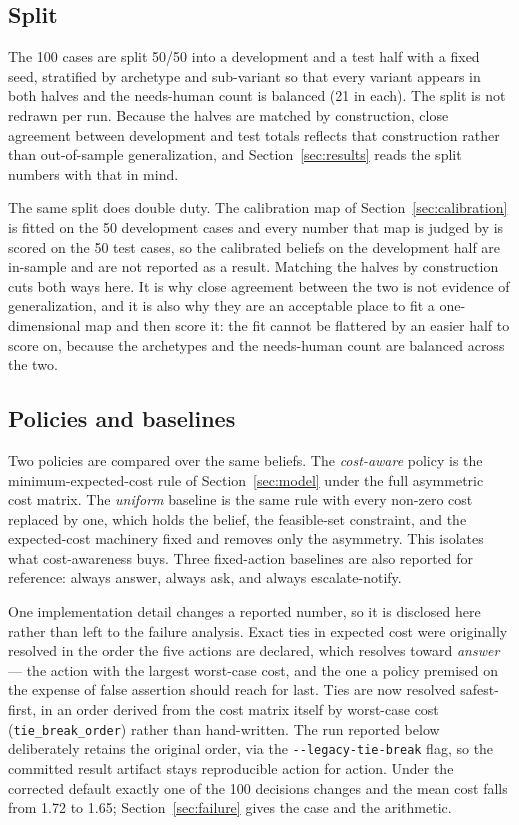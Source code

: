 \documentclass{article}
\begin{document}
\subsection{Split}
The 100 cases are split 50/50 into a development and a test half with a fixed
seed, stratified by archetype and sub-variant so that every variant appears in
both halves and the needs-human count is balanced (21 in each). The split is not
redrawn per run. Because the halves are matched by construction, close agreement
between development and test totals reflects that construction rather than
out-of-sample generalization, and Section~\ref{sec:results} reads the split
numbers with that in mind.

The same split does double duty. The calibration map of
Section~\ref{sec:calibration} is fitted on the 50 development cases and every
number that map is judged by is scored on the 50 test cases, so the calibrated
beliefs on the development half are in-sample and are not reported as a result.
Matching the halves by construction cuts both ways here. It is why close agreement
between the two is not evidence of generalization, and it is also why they are an
acceptable place to fit a one-dimensional map and then score it: the fit cannot be
flattered by an easier half to score on, because the archetypes and the
needs-human count are balanced across the two.

\subsection{Policies and baselines}
Two policies are compared over the same beliefs. The \emph{cost-aware} policy is
the minimum-expected-cost rule of Section~\ref{sec:model} under the full
asymmetric cost matrix. The \emph{uniform} baseline is the same rule with every
non-zero cost replaced by one, which holds the belief, the feasible-set
constraint, and the expected-cost machinery fixed and removes only the asymmetry.
This isolates what cost-awareness buys. Three fixed-action baselines are also
reported for reference: always answer, always ask, and always escalate-notify.

One implementation detail changes a reported number, so it is disclosed here
rather than left to the failure analysis. Exact ties in expected cost were
originally resolved in the order the five actions are declared, which resolves
toward \emph{answer} --- the action with the largest worst-case cost, and the one a
policy premised on the expense of false assertion should reach for last. Ties are
now resolved safest-first, in an order derived from the cost matrix itself by
worst-case cost (\texttt{tie\_break\_order}) rather than hand-written. The run
reported below deliberately retains the original order, via the
\texttt{-}\texttt{-legacy-tie-break} flag, so the committed result artifact stays
reproducible action for action. Under the corrected default exactly one of the 100
decisions changes and the mean cost falls from 1.72 to 1.65;
Section~\ref{sec:failure} gives the case and the arithmetic.
\end{document}
